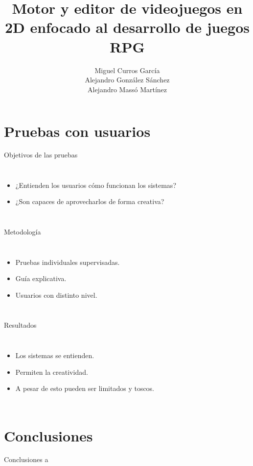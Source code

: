 \documentclass{beamer}
\begin{document}
\section{Pruebas con usuarios}
\begin{frame}{Objetivos de las pruebas}
		\begin{columns}
		\begin{itemize}
			\item ¿Entienden los usuarios cómo funcionan los sistemas?
			\item ¿Son capaces de aprovecharlos de forma creativa?
		\end{itemize}
		
	\end{columns}
\end{frame}
\begin{frame}{Metodología}
\begin{columns}
	\column{0.5\textwidth}
	\begin{itemize}
		\item Pruebas individuales supervisadas.
		\item Guía explicativa.
		\item Usuarios con distinto nivel.
	\end{itemize}
	\column{0.5\textwidth}
	
\end{columns}
\end{frame}
\begin{frame}{Resultados}
\begin{columns}
	\begin{itemize}
		\item Los sistemas se entienden.
		\item Permiten la creatividad.
		\item A pesar de esto pueden ser limitados y toscos.
	\end{itemize}
	
\end{columns}
\end{frame}

\section{Conclusiones}
\begin{frame}{Conclusiones}
a
\end{frame}


\title[2D video game engine and editor focused on RPG game development]{Motor y editor de videojuegos en 2D enfocado al desarrollo de juegos RPG}
\author[Miguel Curros, Alejandro González and Alejandro Massó]{Miguel Curros García\\ Alejandro González Sánchez\\ Alejandro Massó Martínez}
\end{document}
